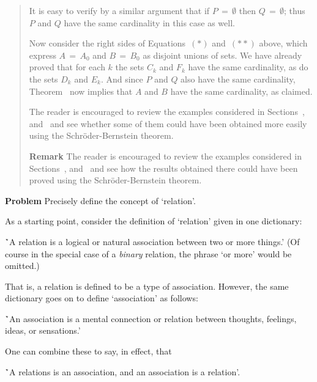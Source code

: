{\begin{quotation}
{        It is easy to verify by a similar argument that if $P \,=\, {\emptyset}$ then $Q \,=\, {\emptyset}$;
    thus $P$ and $Q$ have the same cardinality in this case as well.

        Now consider the right sides of Equations~$({\ast})$ and~$({\ast}{\ast})$ above,
    which express $A \,=\, A_{0}$ and $B \,=\, B_{0}$ as disjoint unions of sets.
    We have already proved that for each $k$ the sets $C_{k}$ and $F_{k}$ have the same cardinality,  as do the sets $D_{k}$ and $E_{k}$.
    And since $P$ and $Q$ also have the same cardinality, Theorem~ now implies that $A$ and $B$ have the same cardinality, as claimed.

\V

The reader is encouraged to review the examples considered in Sections~,  and~ and see whether some of them could have been obtained more easily using the Schr\"{o}der-Bernstein theorem.


\V

        {\bf Remark} The reader is encouraged to review the examples considered in Sections~,  and~ and see how the results obtained there could have been proved using the Schr\"{o}der-Bernstein theorem.
}%
\end{quotation} 



        {\bf Problem} Precisely define the concept of `relation'.

\V

        As a starting point, consider the definition of `relation' given in one dictionary:

        \h `A relation is a logical or natural association between two or more things.'
    (Of course in the special case of a {\em binary} relation, the phrase `or more' would be omitted.)


\noindent That is, a relation is defined to be a type of association. However, the same dictionary goes on to define `association' as follows:


        \h `An association is a mental connection or relation between thoughts, feelings, ideas, or sensations.'

\noindent One can combine these to say, in effect, that

        \h `A relations is an association, and an association is a relation'.


}
